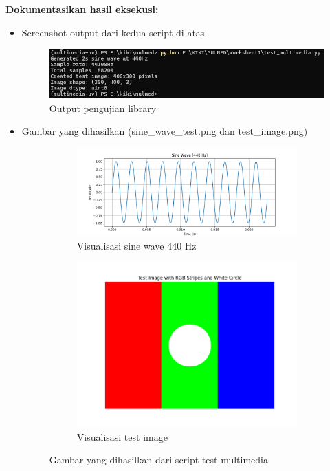 \documentclass[11pt,a4paper]{article}
\begin{document}
\textbf{Dokumentasikan hasil eksekusi:}
\begin{itemize}
    \item Screenshot output dari kedua script di atas
        \begin{figure}[h!]
        \centering
        \includegraphics[scale = 0.84]{Figure/OutputMultimedia.png}
        \caption{Output pengujian library} 
        \vspace{0.1cm}
        \end{figure}
    \item Gambar yang dihasilkan (sine\_wave\_test.png dan test\_image.png)
        \begin{figure}[h]
            \centering
            \begin{subfigure}{0.48\textwidth}
                \includegraphics[width=\linewidth]{Figure/sine_wave_test.png}
                \caption{Visualisasi sine wave 440 Hz}
            \end{subfigure}
            \begin{subfigure}{0.48\textwidth}
                \includegraphics[width=\linewidth]{Figure/test_image.png}
                \caption{Visualisasi test image }
            \end{subfigure}
            \caption{Gambar yang dihasilkan dari script test multimedia}
        \end{figure}
\end{itemize}
\end{document}
